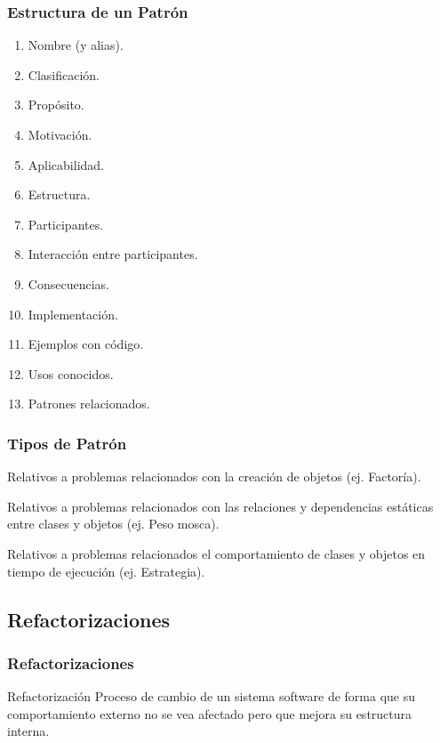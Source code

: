 ﻿\documentclass[animated,a4paper,slidestop,xcolor=pst,blue]{beamer}
\begin{document}
\begin{frame}[c]
	\frametitle{Estructura de un Patrón}
	\begin{enumerate}
		\item<+-> Nombre (y alias).
		\item<+-> Clasificación.
		\item<+-> Propósito.
		\item<+-> Motivación.
		\item<+-> Aplicabilidad.
		\item<+-> Estructura.
		\item<+-> Participantes.
		\item<+-> Interacción entre participantes.
		\item<+-> Consecuencias.
		\item<+-> Implementación.
		\item<+-> Ejemplos con código.
		\item<+-> Usos conocidos.
		\item<+-> Patrones relacionados.
	\end{enumerate}
\end{frame}

\begin{frame}[c]
	\frametitle{Tipos de Patrón}
	\begin{description}
		\item<+->[Creacionales] Relativos a problemas relacionados con la creación de objetos (ej. Factoría).
		\item<+->[Estructurales] Relativos a problemas relacionados con las relaciones y dependencias estáticas entre clases y objetos (ej. Peso mosca).
		\item<+->[De comportamiento] Relativos a problemas relacionados el comportamiento de clases y objetos en tiempo de ejecución (ej. Estrategia).
	\end{description}
\end{frame}

\subsection{Refactorizaciones}

\begin{frame}[c]
	\frametitle{Refactorizaciones}
	\begin{block}{Refactorización}
	Proceso de cambio de un sistema software de forma que su comportamiento externo no se vea afectado pero que mejora su estructura interna.
	\end{block}
\end{frame}
\end{document}
